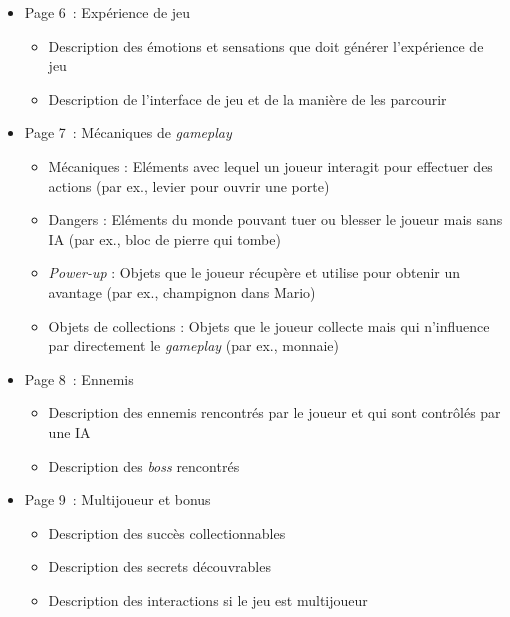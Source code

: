 \addtocounter{table}{-1}

\begin{table}
\footnotesize
\begin{framed}
\begin{itemize}
    \item Page 6~: Expérience de jeu
    \begin{itemize}
        \item Description des émotions et sensations que doit générer l'expérience de jeu
        \item Description de l'interface de jeu et de la manière de les parcourir 


    \end{itemize}
    \item Page 7~:  Mécaniques de \emph{gameplay}
    \begin{itemize}
        \item Mécaniques : Eléments avec lequel un joueur interagit pour effectuer des actions (par ex., levier pour ouvrir une porte)
        \item Dangers : Eléments du monde pouvant tuer ou blesser le joueur mais sans IA (par ex., bloc de pierre qui tombe)
        \item \emph{Power-up} : Objets que le joueur récupère et utilise pour obtenir un avantage (par ex., champignon dans Mario)
        \item Objets de collections : Objets que le joueur collecte mais qui n'influence par directement le \emph{gameplay} (par ex.,  monnaie)
    \end{itemize}
    \item Page 8~: Ennemis
    \begin{itemize}
        \item Description des ennemis rencontrés par le joueur et qui sont contrôlés par une IA
        \item Description des \emph{boss} rencontrés
    \end{itemize}
    \item Page 9~: Multijoueur et bonus
    \begin{itemize}
        \item Description des succès collectionnables
        \item Description des secrets découvrables
        \item Description des interactions si le jeu est multijoueur
    \end{itemize}

\end{itemize}
\end{framed}
\end{table}
